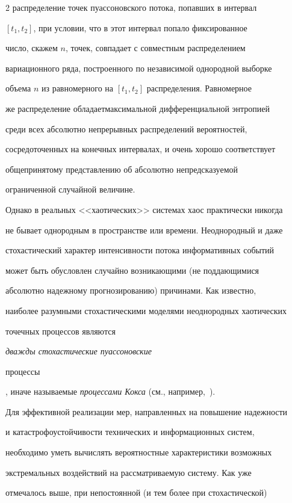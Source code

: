 \begin{multicols}{2}
распределение точек пуассоновского потока, попавших в интервал


$[t_1,t_2]$, при условии, что в этот интервал попало фиксированное


число, скажем $n$, точек, совпадает с совместным распределением


вариационного ряда, построенного по независимой однородной выборке


объема $n$ из равномерного на $[t_1,t_2]$ распределения. Равномерное


же распределение обладает\linebreak максимальной дифференциальной энтропией


среди всех абсолютно непрерывных распределений вероят\-ностей,


сосредоточенных на конечных интервалах, и очень хорошо соответствует


общепринятому представлению об абсолютно непредсказуемой


ограниченной случайной величине.





Однако в реальных <<хаотических>> системах хаос практически никогда


не бывает однородным в пространстве или времени. Неоднородный и даже


стохастический характер интенсивности потока информативных событий


может быть обусловлен случайно возникающими (не поддающимися


абсолютно надежному прогнозированию) причинами. Как известно,


наиболее разумными стохастическими моделями неоднородных хаотических


точечных процессов являются {\it дважды стохастические пуассоновские


процессы}, иначе называемые {\it процессами Кокса} (см., например,~\cite{BeningKorolev2002}).





Для эффективной реализации мер, направленных на повышение надежности


и катастрофоустойчивости технических и информационных сис\-тем,


необходимо уметь вычислять вероятностные характеристики возможных


экстремальных воздействий на рассматриваемую систему. Как уже


отмечалось выше, при непостоянной (и тем более при стохастической)



\end{multicols}
